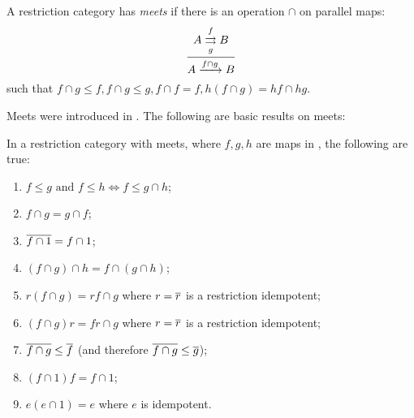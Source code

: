 \begin{definition}
  A restriction category has \emph{meets} if there is an operation $\cap$ on parallel maps:
  \[
    \infer{A\xrightarrow{f\cap g} B}
      {A\overset{f}{\underset{g}{\rightrightarrows}}B}
  \]
  such that $f\cap g \le f, f\cap g \le g, f\cap f = f, h (f\cap g) = h f \cap hg$.
\end{definition}

Meets were introduced in \cite{cockett-guo-hofstra-2012:range2}.
The following are basic results on meets:

\begin{lemma}
  \label{lem:properties_of_meets_in_restriction_categories}
  In a restriction category \X with meets, where $f, g, h$ are maps in
  \X, the following are true:
  \begin{enumerate}[{(}i{)}]
    \item $f\le g \text{ and } f \le h \iff f \le g\cap h$;
        \label{lemsub:properties_of_meets_one}
    \item $f\cap g = g \cap f$;\label{lemsub:properties_of_meets_two}
    \item $\overline{f\cap 1} = f \cap 1$;\label{lemsub:properties_of_meets_three}
    \item $(f \cap g) \cap h = f \cap (g \cap h)$;
    \item $r(f\cap g) = r f \cap g$ where $r=\overline{r}$ is a restriction idempotent;
    \item $(f\cap g)r = f r \cap g$ where $r=\overline{r}$ is a restriction idempotent;
    \item $\overline{f\cap g} \le \overline{f}$ (and therefore $\overline{f\cap g} \le \overline{g}$);
    \item $ (f \cap 1) f = f \cap 1$;
    \item $ e(e \cap 1) = e$ where $e$ is idempotent.
  \end{enumerate}
\end{lemma}
